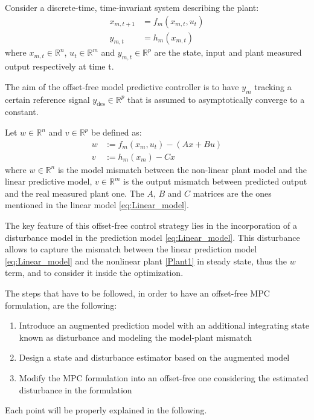 \documentclass[a4paper,12pt,oneside]{book}
\begin{document}
\bigskip
Consider a discrete-time, time-invariant system describing the plant:
\begin{equation}
\begin{aligned}
    x_{m,t+1} &= f_m (x_{m,t}, u_t) \\
    y_{m,t} &= h_m (x_{m,t}) 
\end{aligned}
\label{Plant1}
\end{equation}
where $x_{m,t} \in \mathbb{R}^n$, $u_t \in \mathbb{R}^m$ and $y_{m,t} \in \mathbb{R}^p$ are the state, input and plant measured output respectively at time t.

The aim of the offset-free model predictive controller is to have $y_m$ tracking a certain reference signal $y_{\text{des}} \in \mathbb{R}^p$ that is assumed to asymptotically converge to a constant.

\bigskip
Let $w \in \mathbb{R}^n$ and $v \in \mathbb{R}^p$ be defined as:
\begin{equation}
\begin{aligned}
    w & := f_m (x_m, u_t) - (A x + Bu) \\
    v & := h_m (x_m) - C x
\end{aligned}
\label{Plant_model_mismatch}
\end{equation}
where $w \in \mathbb{R}^n$ is the model mismatch between the non-linear plant model and the linear predictive model, $v \in \mathbb{R}^m$ is the output mismatch between predicted output and the real measured plant one.
The $A$, $B$ and $C$ matrices are the ones mentioned in the linear model \eqref{eq:Linear_model}.

\bigskip
The key feature of this offset-free control strategy lies in the incorporation of a disturbance model in the prediction model \eqref{eq:Linear_model}.
This disturbance allows to capture the mismatch between the linear prediction model \eqref{eq:Linear_model} and the nonlinear plant \eqref{Plant1} in steady state, thus the $w$ term, and to consider it inside the optimization.

The steps that have to be followed, in order to have an offset-free MPC formulation, are the following:
\begin{enumerate}
	\item Introduce an augmented prediction model with an additional integrating state known as disturbance and modeling the model-plant mismatch
	\item Design a state and disturbance estimator based on the augmented model
	\item Modify the MPC formulation into an offset-free one considering the estimated disturbance in the formulation
\end{enumerate}
Each point will be properly explained in the following.
\end{document}
